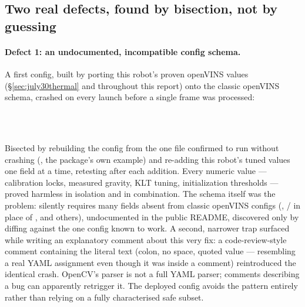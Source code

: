 \subsection{Two real defects, found by bisection, not by guessing}

\paragraph{Defect 1: an undocumented, incompatible config schema.} A
first config, built by porting this robot's proven openVINS values
(\S\ref{sec:july30thermal} and throughout this report) onto the classic
openVINS  schema, crashed on every launch
before a single frame was processed:
\begin{center}
\\
\\
\end{center}
Bisected by rebuilding the config from the one file confirmed to run
without crashing (, the
package's own example) and re-adding this robot's tuned values one
field at a time, retesting after each addition. Every numeric value ---
calibration locks, measured gravity, KLT tuning, initialization
thresholds --- proved harmless in isolation and in combination. The
schema itself was the problem:  silently requires many
fields absent from classic openVINS configs (,
/ in place of
, and others), undocumented in the public
README, discovered only by diffing against the one config known to
work. A second, narrower trap surfaced while writing an explanatory
comment about this very fix: a code-review-style comment containing the
literal text  (colon, no space, quoted value ---
resembling a real YAML assignment even though it was inside a \code{\#}
comment) reintroduced the identical crash. OpenCV's 
parser is not a full YAML parser; comments describing a bug can
apparently retrigger it. The deployed config avoids the pattern
entirely rather than relying on a fully characterised safe subset.

